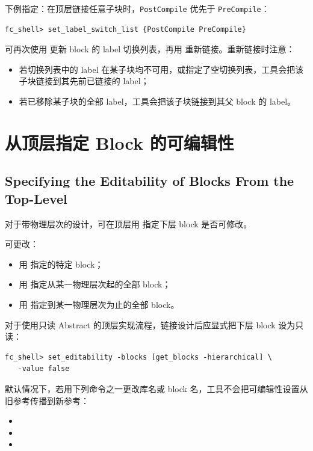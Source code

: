 下例指定：在顶层链接任意子块时，\texttt{PostCompile} 优先于 \texttt{PreCompile}：
\begin{lstlisting}
fc_shell> set_label_switch_list {PostCompile PreCompile}
\end{lstlisting}

可再次使用  更新 block 的 label 切换列表，再用  重新链接。重新链接时注意：
\begin{itemize}
  \item 若切换列表中的 label 在某子块均不可用，或指定了空切换列表，工具会把该子块链接到其先前已链接的 label；
  \item 若已移除某子块的全部 label，工具会把该子块链接到其父 block 的 label。
\end{itemize}

\section{从顶层指定 Block 的可编辑性}
\subsection*{Specifying the Editability of Blocks From the Top-Level}

对于带物理层次的设计，可在顶层用  指定下层 block 是否可修改。

可更改：
\begin{itemize}
  \item 用  指定的特定 block；
  \item 用  指定从某一物理层次起的全部 block；
  \item 用  指定到某一物理层次为止的全部 block。
\end{itemize}

对于使用只读 Abstract 的顶层实现流程，链接设计后应显式把下层 block 设为只读：
\begin{lstlisting}
fc_shell> set_editability -blocks [get_blocks -hierarchical] \
   -value false
\end{lstlisting}

默认情况下，若用下列命令之一更改库名或 block 名，工具不会把可编辑性设置从旧参考传播到新参考：
\begin{itemize}
  \item {}
  \item {}
  \item {}
\end{itemize}

